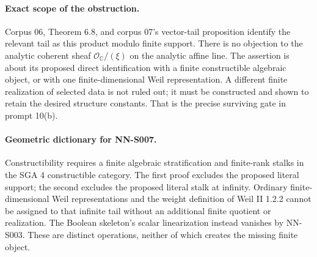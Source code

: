 \paragraph{Exact scope of the obstruction.}
Corpus 06, Theorem 6.8, and corpus 07's vector-tail proposition
identify the relevant tail as this product modulo finite support.
There is no objection to the analytic coherent sheaf
$\mathcal O_{\mathbb C}/(\xi)$ on the analytic affine line.
The assertion is about its proposed direct identification with a
finite constructible algebraic object, or with one finite-dimensional
Weil representation. A different finite realization of selected
data is not ruled out; it must be constructed and shown to retain
the desired structure constants. That is the precise surviving
gate in prompt 10(b).

\paragraph{Geometric dictionary for NN-S007.}
Constructibility requires a finite algebraic stratification and
finite-rank stalks in the SGA 4 constructible category. The first
proof excludes the proposed literal support; the second excludes
the proposed literal stalk at infinity. Ordinary finite-dimensional
Weil representations and the weight definition of Weil II 1.2.2
cannot be assigned to that infinite tail without an additional
finite quotient or realization. The Boolean skeleton's scalar
linearization instead vanishes by NN-S003. These are distinct
operations, neither of which creates the missing finite object.
